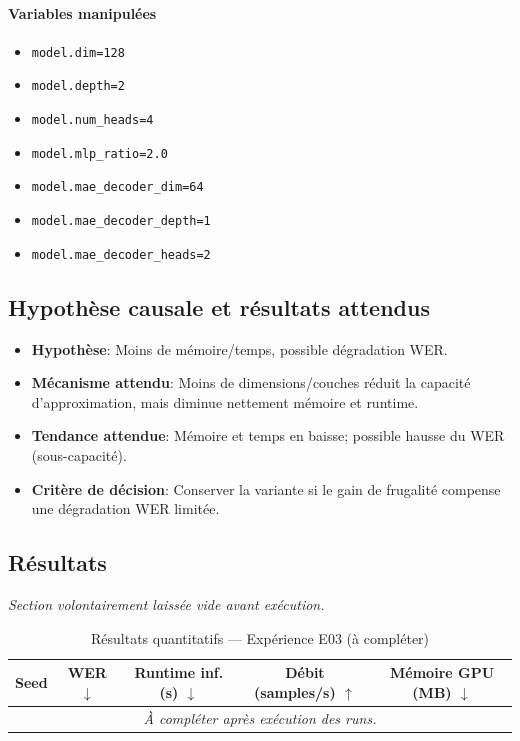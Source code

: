 \documentclass[11pt,a4paper]{article}
\begin{document}
\paragraph{Variables manipulées}
\begin{itemize}
\item \texttt{model.dim=128}
\item \texttt{model.depth=2}
\item \texttt{model.num\_heads=4}
\item \texttt{model.mlp\_ratio=2.0}
\item \texttt{model.mae\_decoder\_dim=64}
\item \texttt{model.mae\_decoder\_depth=1}
\item \texttt{model.mae\_decoder\_heads=2}
\end{itemize}

\subsection{Hypothèse causale et résultats attendus}
\begin{itemize}[leftmargin=1.2cm]
\item \textbf{Hypothèse}: Moins de mémoire/temps, possible dégradation WER.
\item \textbf{Mécanisme attendu}: Moins de dimensions/couches réduit la capacité d'approximation, mais diminue nettement mémoire et runtime.
\item \textbf{Tendance attendue}: Mémoire et temps en baisse; possible hausse du WER (sous-capacité).
\item \textbf{Critère de décision}: Conserver la variante si le gain de frugalité compense une dégradation WER limitée.
\end{itemize}

\subsection{Résultats}
\textit{Section volontairement laissée vide avant exécution.}

\begin{table}[H]
\centering
\caption{Résultats quantitatifs --- Expérience E03 (à compléter)}
\begin{tabular}{lcccc}
\toprule
Seed & WER $\downarrow$ & Runtime inf. (s) $\downarrow$ & Débit (samples/s) $\uparrow$ & Mémoire GPU (MB) $\downarrow$ \\
\midrule
\multicolumn{5}{c}{\textit{À compléter après exécution des runs.}} \\
\bottomrule
\end{tabular}
\end{table}
\end{document}
